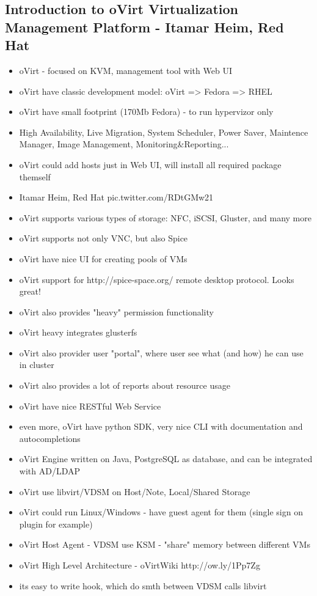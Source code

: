 \documentclass[10pt]{article}
\begin{document}
{\subsection{Introduction to oVirt Virtualization Management Platform - Itamar Heim, Red Hat}
\begin{itemize}
\item oVirt - focused on KVM, management tool with Web UI
\item oVirt have classic development model: oVirt => Fedora => RHEL
\item oVirt have small footprint (170Mb Fedora) - to run hypervizor only
\item High Availability, Live Migration, System Scheduler, Power Saver, Maintence Manager, Image Management, Monitoring\&Reporting...
\item oVirt could add hosts just in Web UI, will install all required package themself
\item Itamar Heim, Red Hat pic.twitter.com/RDtGMw21
\item oVirt supports various types of storage: NFC, iSCSI, Gluster, and many more
\item oVirt supports not only VNC, but also Spice
\item oVirt have nice UI for creating pools of VMs
\item oVirt support for http://spice-space.org/  remote desktop protocol. Looks great!
\item oVirt also provides "heavy" permission functionality
\item oVirt heavy integrates glusterfs
\item oVirt also provider user "portal", where user see what (and how) he can use in cluster
\item oVirt also provides a lot of reports about resource usage
\item oVirt have nice RESTful Web Service
\item even more, oVirt have python SDK, very nice CLI with documentation and autocompletions
\item oVirt Engine written on Java, PostgreSQL as database, and can be integrated with AD/LDAP
\item oVirt use libvirt/VDSM on Host/Note, Local/Shared Storage
\item oVirt could run Linux/Windows - have guest agent for them (single sign on plugin for example)
\item oVirt Host Agent - VDSM use KSM - "share" memory between different VMs
\item oVirt High Level Architecture - oVirtWiki http://ow.ly/1Pp7Zg 
\item its easy to write hook, which do smth between VDSM calls libvirt
\end{itemize}

}
\end{document}
